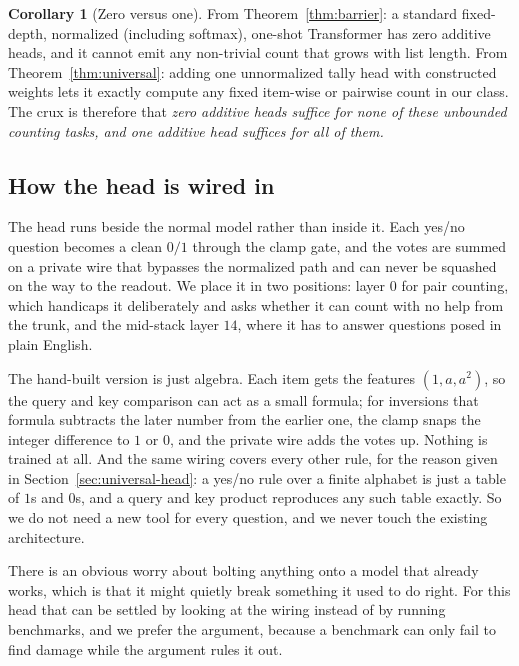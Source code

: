 \documentclass[10pt]{article}
\theoremstyle{definition}
\newtheorem{corollary}{Corollary}
\begin{document}
\begin{corollary}[Zero versus one]
\label{cor:zeroone}
From Theorem~\ref{thm:barrier}: a standard fixed-depth, normalized
(including softmax), one-shot Transformer has zero additive heads, and it
cannot emit any non-trivial count that grows with list length. From
Theorem~\ref{thm:universal}: adding one unnormalized tally head with
constructed weights lets it exactly compute any fixed item-wise or
pairwise count in our class. The crux is therefore that \emph{zero
additive heads suffice for none of these unbounded counting tasks, and one
additive head suffices for all of them.}
\end{corollary}

\subsection{How the head is wired in}
\label{sec:wiring}

The head runs beside the normal model rather than inside it. Each yes/no
question becomes a clean $0/1$ through the clamp gate, and the votes are
summed on a private wire that bypasses the normalized path and can never be
squashed on the way to the readout. We place it in two positions: layer $0$
for pair counting, which handicaps it deliberately and asks whether it can
count with no help from the trunk, and the mid-stack layer $14$, where it
has to answer questions posed in plain English.

The hand-built version is just algebra. Each item gets the features
$(1, a, a^2)$, so the query and key comparison can act as a small formula;
for inversions that formula subtracts the later number from the earlier
one, the clamp snaps the integer difference to $1$ or $0$, and the private
wire adds the votes up. Nothing is trained at all. And the same wiring
covers every other rule, for the reason given in
Section~\ref{sec:universal-head}: a yes/no rule over a finite alphabet is
just a table of $1$s and $0$s, and a query and key product reproduces any
such table exactly. So we do not need a new tool for every question, and we
never touch the existing architecture.

There is an obvious worry about bolting anything onto a model that already
works, which is that it might quietly break something it used to do right.
For this head that can be settled by looking at the wiring instead of by
running benchmarks, and we prefer the argument, because a benchmark can only
fail to find damage while the argument rules it out.
\end{document}
